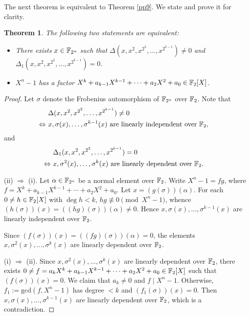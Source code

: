 \documentclass{amsart}
\newtheorem{thm}{Theorem}[section]
\numberwithin{equation}{section}
\theoremstyle{definition}
\newcommand{\f}{\Bbb F}
\begin{document}
\medskip

The next theorem is equivalent to Theorem \ref{pp9}. We state and prove it for clarity.
\begin{thm}\label{T2.1}
The following two statements are equivalent:
\begin{itemize}
\item[(i)] There exists $x\in\f_{2^n}$ such that $\Delta(x,x^2,x^{2^2},\dots,x^{2^{k-1}})\ne0$ and\\ $\Delta_1(x,x^2,x^{2^2},\dots,x^{2^{k-1}})=0$.

\item[(ii)] $X^n-1$ has a factor $X^k+a_{k-1}X^{k-1}+\cdots+a_2X^2+a_0\in\f_2[X]$.
\end{itemize}
\end{thm}

\begin{proof}
Let $\sigma$ denote the Frobenius automorphism  of $\f_{2^n}$ over $\f_2$. Note that 
\begin{align*}
&\Delta(x,x^2,x^{2^2},\dots,x^{2^{k-1}})\ne0\cr
\Leftrightarrow\ &x,\sigma(x),\dots,\sigma^{k-1}(x)\ \text{are linearly independent over}\ \f_2,
\end{align*}
and 
\begin{align*}
&\Delta_1(x,x^2,x^{2^2},\dots,x^{2^{k-1}})=0\cr
\Leftrightarrow\ &x,\sigma^2(x),\dots,\sigma^{k}(x)\ \text{are linearly dependent over}\ \f_2.
\end{align*}

\medskip
(ii) $\Rightarrow$ (i). Let $\alpha\in\f_{2^n}$ be a normal element over $\f_2$. Write $X^n-1=fg$, where $f=X^k+a_{k-1}X^{k-1}+\cdots+a_2X^2+a_0$. Let $x=(g(\sigma))(\alpha)$. For each $0\ne h\in\f_2[X]$ with $\deg h<k$, $hg\not\equiv 0\pmod{X^n-1}$, whence $(h(\sigma))(x)=((hg)(\sigma))(\alpha)\ne 0$. Hence $x,\sigma(x),\dots,\sigma^{k-1}(x)$ are linearly independent over $\f_2$. 

Since $(f(\sigma))(x)=((fg)(\sigma))(\alpha)=0$, the elements $x,\sigma^2(x),\dots,\sigma^k(x)$ are linearly dependent over $\f_2$.

\medskip
(i) $\Rightarrow$ (ii). Since $x,\sigma^2(x),\dots,\sigma^k(x)$ are linearly dependent over $\f_2$, there exists $0\ne f=a_kX^k+a_{k-1}X^{k-1}+\cdots+a_2X^2+a_0\in\f_2[X]$ such that $(f(\sigma))(x)=0$. We claim that $a_k\ne0$ and $f\mid X^n-1$. Otherwise, $f_1:=\text{gcd}(f,X^n-1)$ has degree $<k$ and $(f_1(\sigma))(x)=0$. Then $x,\sigma(x),\dots,\sigma^{k-1}(x)$ are linearly dependent over $\f_2$, which is a contradiction. 
\end{proof}
\end{document}
